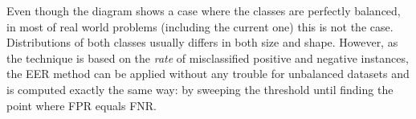 Even though the diagram shows a case where the classes are perfectly balanced, in most of
real world problems (including the current one) this is not the case. Distributions of both
classes usually differs in both size and shape. However,
as the technique is based on the \textit{rate} of misclassified positive and negative instances,
the EER method can be applied without any trouble for unbalanced datasets and
is computed exactly the same way: by sweeping the threshold until finding the point
where FPR equals FNR.








